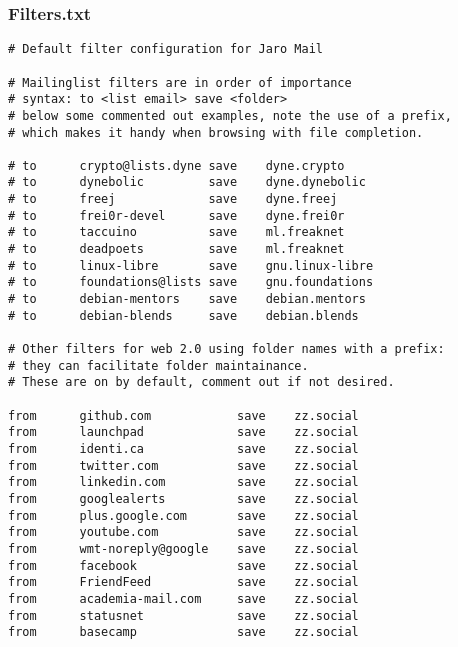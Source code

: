 \documentclass[a4,onecolumn,portrait]{article}
\begin{document}
\subsubsection{Filters.txt}
\label{sec-14-1-2}

\begin{verbatim}
# Default filter configuration for Jaro Mail

# Mailinglist filters are in order of importance
# syntax: to <list email> save <folder>
# below some commented out examples, note the use of a prefix,
# which makes it handy when browsing with file completion.

# to	  crypto@lists.dyne	save	dyne.crypto
# to	  dynebolic		    save	dyne.dynebolic
# to	  freej			    save	dyne.freej
# to	  frei0r-devel		save	dyne.frei0r
# to	  taccuino		    save	ml.freaknet
# to	  deadpoets		    save	ml.freaknet
# to	  linux-libre		save	gnu.linux-libre
# to	  foundations@lists	save	gnu.foundations
# to	  debian-mentors	save	debian.mentors
# to	  debian-blends		save	debian.blends

# Other filters for web 2.0 using folder names with a prefix:
# they can facilitate folder maintainance.
# These are on by default, comment out if not desired.

from      github.com            save	zz.social
from      launchpad	            save	zz.social
from      identi.ca             save	zz.social
from      twitter.com		    save	zz.social
from      linkedin.com		    save	zz.social
from      googlealerts		    save	zz.social
from      plus.google.com	    save	zz.social
from      youtube.com		    save	zz.social
from      wmt-noreply@google	save	zz.social
from      facebook		        save	zz.social
from      FriendFeed		    save	zz.social
from      academia-mail.com	    save	zz.social
from      statusnet		        save	zz.social
from      basecamp		        save	zz.social
\end{verbatim}
\end{document}

